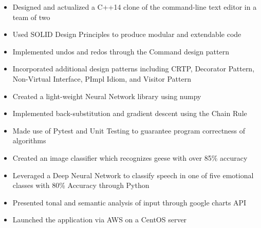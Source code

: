 \documentclass[10pt,a4paper,ragged2e]{altacv}
\begin{document}
\begin{itemize}
    \item Designed and actualized a C++14 clone of the command-line text editor in a team of two
    \item Used SOLID Design Principles to produce modular and extendable code
    \item Implemented undos and redos through the Command design pattern
    \item Incorporated additional design patterns including CRTP, Decorator Pattern, Non-Virtual Interface, PImpl Idiom, and Visitor Pattern
\end{itemize}

\begin{itemize}
    \item Created a light-weight Neural Network library using numpy
    \item Implemented back-substitution and gradient descent using the Chain Rule
    \item Made use of Pytest and Unit Testing to guarantee program correctness of algorithms
    \item Created an image classifier which recognizes geese with over 85\% accuracy
\end{itemize}

\begin{itemize}
   \item Leveraged a Deep Neural Network to classify speech in one of five emotional classes with 80\% Accuracy through Python
   \item Presented tonal and semantic analysis of input through google charts API
   \item Launched the application via AWS on a CentOS server
\end{itemize}
\end{document}

